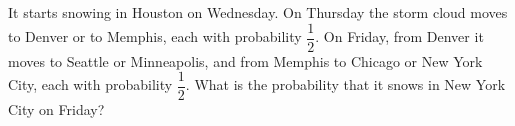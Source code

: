 It starts snowing in Houston on Wednesday. On Thursday the storm cloud moves to Denver or to Memphis, each with probability $\dfrac12$. On Friday, from Denver it moves to Seattle or Minneapolis, and from Memphis to Chicago or New York City, each with probability $\dfrac12$. What is the probability that it snows in New York City on Friday?
